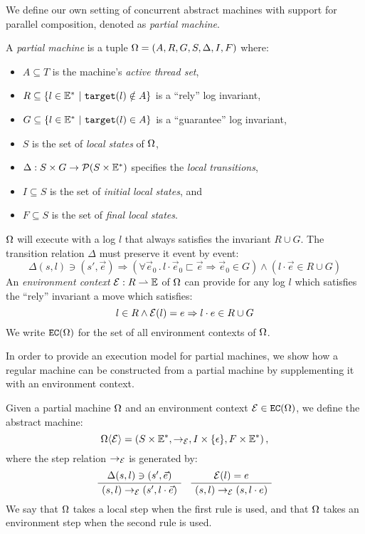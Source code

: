 We define our own setting of concurrent abstract machines
with support for parallel composition,
denoted as \emph{partial machine}.
\begin{definition}
\label{def:partialm}
A \emph{partial machine} is a tuple $\Omega = (A, R, G, S, \Delta, I, F)$
where:
\begin{itemize}
\item
$A \subseteq T$ is the machine's \emph{active thread set},
\item
$R \subseteq \{ l \in \Ev^* \ |\ \kw{target}(l) \notin A \}$ is a ``rely'' log invariant,
\item
$G \subseteq \{ l \in \Ev^* \ |\ \kw{target}(l) \in A \}$ is a ``guarantee'' log invariant,
\item
$S$ is the set of \emph{local states} of $\Omega$,
\item
$\Delta : S \times G \rightarrow \mathcal{P}(S \times \mathbb{E}^*)$
specifies the \emph{local transitions},
\item
$I \subseteq S$ is the set of \emph{initial local states}, and
\item
$F \subseteq S$ is the set of \emph{final local states}.
\end{itemize}
$\Omega$ will execute with a log $l$ that always satisfies the invariant $R \cup G$.
The transition relation $\Delta$ must preserve it event by event:
\[ \Delta(s, l) \ni (s', \vec{e}) \Rightarrow (\forall \vec{e}_0 \,.\, l \cdot \vec{e}_0 \sqsubset \vec{e} \Rightarrow \vec{e}_0 \in G) \wedge (l \cdot \vec{e} \in R \cup G) \]
An \emph{environment context} $\mathcal{E} : R \rightharpoonup \mathbb{E}$
of $\Omega$ can provide for any log $l$
which satisfies the ``rely'' invariant
a move which satisfies:
\[ l \in R \land \mathcal{E}(l) = e \Rightarrow l \cdot e \in R \cup G \]
We write ${{{\texttt{EC}}}({\Omega})}$ for the set of all environment contexts of $\Omega$.
\end{definition}

In order to provide an execution model for partial machines,
we show how a regular machine can be constructed
from a partial machine
by supplementing it with an environment context.

\begin{definition}
Given a partial machine $\Omega$ and an environment context $\mathcal{E} \in {{{\texttt{EC}}}({\Omega})}$,
we define the abstract machine:
\[ \Omega \langle \mathcal{E} \rangle =
	(S \times \mathbb{E}^*, \rightarrow_{\mathcal{E}}, I \times \{\epsilon\}, F \times \mathbb{E}^*) \,, \]
where the step relation $\rightarrow_{\mathcal{E}}$ is generated by:
\[
	\AxiomC{$\Delta(s, l) \ni (s', \vec{e})$}
	\UnaryInfC{$(s, l) \rightarrow_\Env (s', l \cdot \vec{e})$}
	\DisplayProof
	\quad
	\AxiomC{$\Env(l) = e$}
	\UnaryInfC{$(s, l) \rightarrow_\Env (s, l \cdot e)$}
	\DisplayProof
\]
We say that $\Omega$ takes a local step when the first rule is used,
and that $\Omega$ takes an environment step when the second rule is used.
\end{definition}

